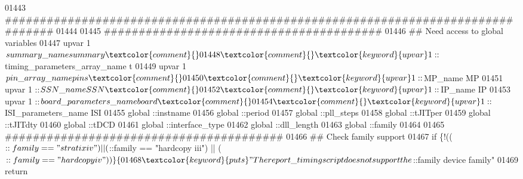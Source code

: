 \begin{DoxyCode}
01443 \textcolor{comment}{}\textcolor{comment}{   }\textcolor{comment}{################################################################################}
01444 \textcolor{comment}{}
01445    \textcolor{comment}{########################################}
01446 \textcolor{comment}{}\textcolor{comment}{   }\textcolor{comment}{## Need access to global variables}
01447 \textcolor{comment}{}\textcolor{comment}{   }\textcolor{keyword}{upvar} 1 $summary\_name summary\textcolor{comment}{}
01448 \textcolor{comment}{}   \textcolor{keyword}{upvar} 1 ::$timing\_parameters\_array\_name t\textcolor{comment}{}
01449 \textcolor{comment}{}   \textcolor{keyword}{upvar} 1 $pin\_array\_name pins\textcolor{comment}{}
01450 \textcolor{comment}{}   \textcolor{keyword}{upvar} 1 ::$MP\_name MP\textcolor{comment}{}
01451 \textcolor{comment}{}   \textcolor{keyword}{upvar} 1 ::$SSN\_name SSN\textcolor{comment}{}
01452 \textcolor{comment}{}   \textcolor{keyword}{upvar} 1 ::$IP\_name IP\textcolor{comment}{}
01453 \textcolor{comment}{}   \textcolor{keyword}{upvar} 1 ::$board\_parameters\_name board\textcolor{comment}{}
01454 \textcolor{comment}{}   \textcolor{keyword}{upvar} 1 ::$ISI\_parameters\_name ISI\textcolor{comment}{  }
01455 \textcolor{comment}{}   \textcolor{keyword}{global} ::instname\textcolor{comment}{   }
01456 \textcolor{comment}{}   \textcolor{keyword}{global} ::period\textcolor{comment}{}
01457 \textcolor{comment}{}   \textcolor{keyword}{global} ::pll\_steps\textcolor{comment}{}
01458 \textcolor{comment}{}   \textcolor{keyword}{global} ::tJITper\textcolor{comment}{}
01459 \textcolor{comment}{}   \textcolor{keyword}{global} ::tJITdty\textcolor{comment}{}
01460 \textcolor{comment}{}   \textcolor{keyword}{global} ::tDCD\textcolor{comment}{}
01461 \textcolor{comment}{}   \textcolor{keyword}{global} ::interface\_type\textcolor{comment}{}
01462 \textcolor{comment}{}   \textcolor{keyword}{global} ::dll\_length\textcolor{comment}{}
01463 \textcolor{comment}{}   \textcolor{keyword}{global} ::family\textcolor{comment}{}
01464 \textcolor{comment}{}   
01465    \textcolor{comment}{########################################}
01466 \textcolor{comment}{}\textcolor{comment}{   }\textcolor{comment}{## Check family support}
01467 \textcolor{comment}{}\textcolor{comment}{   }\textcolor{keyword}{if} \{!(($::family == "stratix iv") || ($::family == "hardcopy iii") || ($::family == "hardcopy
       iv"))\} \{
01468        \textcolor{keyword}{puts} "The report\_timing script does not support the $::family device family"\textcolor{comment}{}
01469 \textcolor{comment}{}       \textcolor{keyword}{return}\textcolor{comment}{}

\end{DoxyCode}
